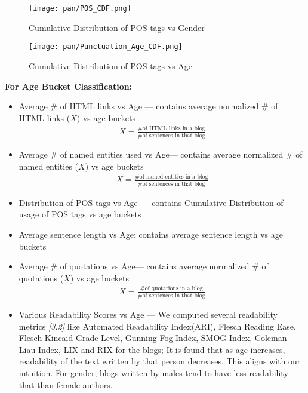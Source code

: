 \documentclass{sig-alternate}
\begin{document}

\begin{figure*}
\texttt{[image: pan/POS\_CDF.png]}%
\caption{Cumulative Distribution of POS tags vs Gender}
\end{figure*}
\begin{figure*}
\texttt{[image: pan/Punctuation\_Age\_CDF.png]}%
\caption{Cumulative Distribution of POS tags vs Age}
\end{figure*}


\textbf{For Age Bucket Classification:}
\begin{itemize}
\item Average \# of HTML links vs Age --- contains average normalized \# of HTML links ($X$) vs age buckets
\begin{align}
X = \frac{\# \textrm{of HTML links in a blog}}{\#\textrm{of sentences in that blog}}
\end{align}
\item Average \# of named entities used vs Age--- contains average normalized \# of named entities ($X$) vs age buckets
\begin{align}
X = \frac{\# \textrm{of named entities in a blog}}{\#\textrm{of sentences in that blog}}
\end{align}
\item Distribution of POS tags vs Age --- contains Cumulative Distribution of usage of POS tags vs age buckets
\item Average sentence length vs Age: contains average sentence length vs age buckets 
\item Average \# of quotations vs Age--- contains average normalized \# of quotations ($X$) vs age buckets
\begin{align}
X = \frac{\# \textrm{of quotations in a blog}}{\#\textrm{of sentences in that blog}}
\end{align}
\item Various Readability Scores vs Age --- We computed several readability metrics \textit{[3.2]} like Automated Readability Index(ARI), Flesch Reading Ease, Flesch Kincaid Grade Level, Gunning Fog Index, SMOG Index, Coleman Liau Index, LIX and RIX for the blogs; It is found that as age increases, readability of the text written by that person decreases. This aligns with our intuition. For gender, blogs written by males tend to have less readability that than female authors. 
\end{itemize}
\end{document}
